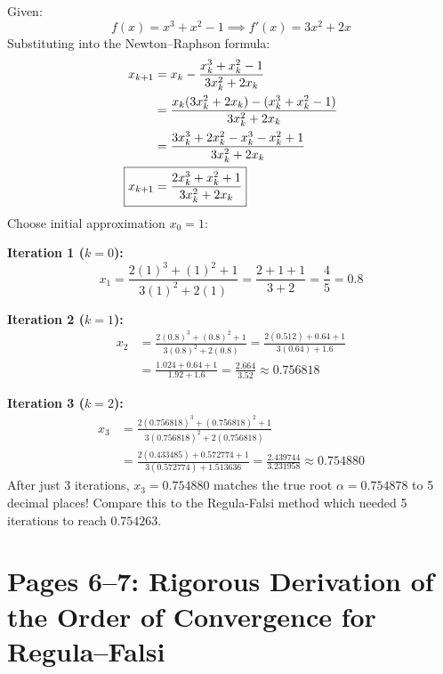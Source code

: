 \begin{examplebox}[Detailed Analytical Solution for $x^3 + x^2 - 1 = 0$]
Given:
\begin{equation}
    f(x) = x^3 + x^2 - 1 \implies f'(x) = 3x^2 + 2x
\end{equation}
Substituting into the Newton--Raphson formula:
\begin{align}
    x_{k+1} &= x_k - \frac{x_k^3 + x_k^2 - 1}{3x_k^2 + 2x_k} \nonumber \\
    &= \frac{x_k(3x_k^2 + 2x_k) - (x_k^3 + x_k^2 - 1)}{3x_k^2 + 2x_k} \nonumber \\
    &= \frac{3x_k^3 + 2x_k^2 - x_k^3 - x_k^2 + 1}{3x_k^2 + 2x_k} \nonumber \\
    \Aboxed{x_{k+1} &= \frac{2x_k^3 + x_k^2 + 1}{3x_k^2 + 2x_k}}
\end{align}
Choose initial approximation $x_0 = 1$:

\textbf{Iteration 1 ($k = 0$):}
\begin{equation}
    x_1 = \frac{2(1)^3 + (1)^2 + 1}{3(1)^2 + 2(1)} = \frac{2 + 1 + 1}{3 + 2} = \frac{4}{5} = \mathbf{0.8}
\end{equation}

\textbf{Iteration 2 ($k = 1$):}
\begin{align}
    x_2 &= \frac{2(0.8)^3 + (0.8)^2 + 1}{3(0.8)^2 + 2(0.8)} = \frac{2(0.512) + 0.64 + 1}{3(0.64) + 1.6} \nonumber \\
    &= \frac{1.024 + 0.64 + 1}{1.92 + 1.6} = \frac{2.664}{3.52} \approx \mathbf{0.756818}
\end{align}

\textbf{Iteration 3 ($k = 2$):}
\begin{align}
    x_3 &= \frac{2(0.756818)^3 + (0.756818)^2 + 1}{3(0.756818)^2 + 2(0.756818)} \nonumber \\
    &= \frac{2(0.433485) + 0.572774 + 1}{3(0.572774) + 1.513636} = \frac{2.439744}{3.231958} \approx \mathbf{0.754880}
\end{align}
After just 3 iterations, $x_3 = 0.754880$ matches the true root $\alpha = 0.754878$ to 5 decimal places! Compare this to the Regula-Falsi method which needed 5 iterations to reach $0.754263$.
\end{examplebox}

\section{Pages 6--7: Rigorous Derivation of the Order of Convergence for Regula--Falsi}
\label{sec:page6_7_regula_convergence}

